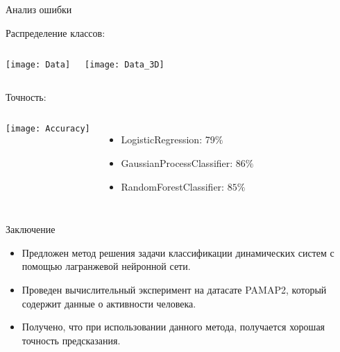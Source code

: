 \documentclass{beamer}
\begin{document}

\begin{frame}{Анализ ошибки}

    Распределение классов:

        \begin{columns}[c]
        
                \texttt{[image: Data]}
                
                \texttt{[image: Data\_3D]}
                
        \end{columns}

        Точность:

        \begin{columns}[c]
        
                \texttt{[image: Accuracy]}
                
                    \begin{itemize}

                        \item LogisticRegression: 79$\%$

                        \item GaussianProcessClassifier: $86\%$

                        \item RandomForestClassifier: $85\%$

                    \end{itemize}
                
        \end{columns}


\end{frame}


\begin{frame}{Заключение}

    \begin{itemize}
    
        \item Предложен метод решения задачи классификации динамических систем с помощью лагранжевой нейронной сети.

        \item Проведен вычислительный эксперимент на датасате PAMAP2, который содержит данные о активности человека.
        
        \item Получено, что при использовании данного метода, получается хорошая точность предсказания.
        
    \end{itemize}
    
\end{frame}

\end{document}
